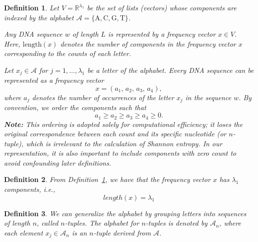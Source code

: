\documentclass{article}
\newtheorem{Definition}{Definition}[section]
\theoremstyle{remark}
\begin{document}
\begin{Definition}\label{def:1.1}
Let 
\(V=\mathbb{R}^{\lambda_1}\)
be the set of lists (vectors) whose components are indexed by the alphabet 
\(\mathcal{A} = \{\mathrm{A},\mathrm{C},\mathrm{G},\mathrm{T}\}\).

Any DNA sequence \(w\) of length \(L\) is represented by a frequency vector
\(x\in V\).
 Here, \(\mathrm{length}(x)\) denotes the number of components in the frequency vector \(x\) corresponding to the counts of each letter.

Let \(x_j \in \mathcal{A}\) for \(j = 1, \dots, \lambda_1\) be a letter of the alphabet. Every DNA sequence can be represented as a frequency vector 
\begin{equation}
x = (a_1,\, a_2,\, a_3,\, a_4),
\end{equation}
where \(a_j\) denotes the number of occurrences of the letter \(x_j\) in the sequence \(w\). By convention, we order the components such that
\begin{equation}
a_1 \ge a_2 \ge a_3 \ge a_4 \ge 0.
\end{equation}
\textbf{Note:} This ordering is adopted solely for computational efficiency; it loses the original correspondence between each count and its specific nucleotide (or \(n\)-tuple), which is irrelevant to the calculation of Shannon entropy. In our representation, it is also important to include components with zero count to avoid confounding later definitions.
\end{Definition}


\begin{Definition}\label{def:1.2}
From Definition~\ref{def:1.1}, we have that the frequency vector \(x\) has \(\lambda_1\) components, i.e.,
\begin{equation}
length(x) = \lambda_1
\end{equation}
\cite{ref19}
\end{Definition}

\begin{Definition}\label{def:1.3}
We can generalize the alphabet by grouping letters into sequences of length \(n\), called \emph{$n$-tuples}\cite{ref20}. The alphabet for \(n\)-tuples is denoted by \(\mathcal{A}_n\), where each element \(x_j \in \mathcal{A}_n\) is an \(n\)-tuple derived from \(\mathcal{A}\).
\end{Definition}
\end{document}

